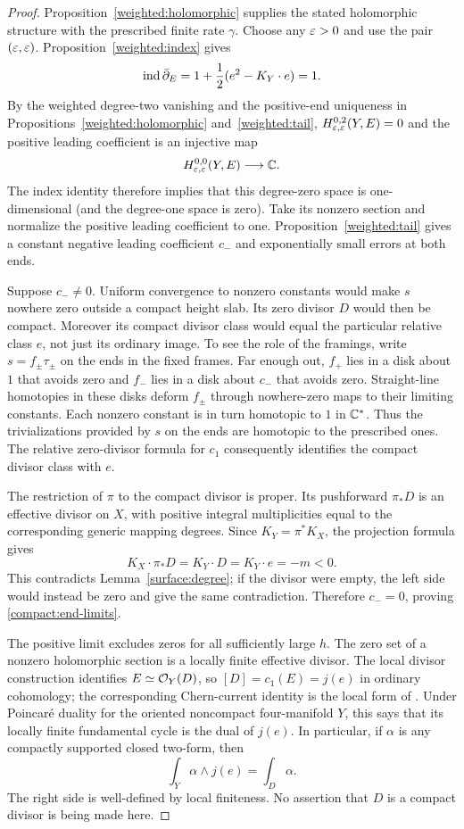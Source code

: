 \begin{proof}
Proposition~\ref{weighted:holomorphic} supplies the stated holomorphic
structure with the prescribed finite rate $\gamma$. Choose any
$\varepsilon>0$ and use the pair $(\varepsilon,\varepsilon)$.
Proposition~\ref{weighted:index} gives
\[
 \operatorname{ind}\bar\partial_E
 =1+\frac12(e^2-K_Y\cdot e)=1.
\]
By the weighted degree-two vanishing and the positive-end uniqueness
in Propositions~\ref{weighted:holomorphic} and~\ref{weighted:tail},
$H^{0,2}_{\varepsilon,\varepsilon}(Y,E)=0$ and
the positive leading coefficient is an injective map
\[
 H^{0,0}_{\varepsilon,\varepsilon}(Y,E)\longrightarrow\mathbb C.
\]
The index identity therefore implies that this degree-zero space is
one-dimensional (and the degree-one space is zero). Take its nonzero
section and normalize the positive leading coefficient to one.
Proposition~\ref{weighted:tail} gives a constant negative leading coefficient
$c_-$ and exponentially small errors at both ends.

Suppose $c_-\neq0$. Uniform convergence to nonzero constants would make
$s$ nowhere zero outside a compact height slab. Its zero divisor $D$
would then be compact. Moreover its compact divisor class would equal
the particular relative class $e$, not just its ordinary image. To see
the role of the framings, write $s=f_\pm\tau_\pm$ on the ends in the
fixed frames. Far enough out, $f_+$ lies in a disk about $1$ that avoids
zero and $f_-$ lies in a disk about $c_-$ that avoids zero. Straight-line
homotopies in these disks deform $f_\pm$ through nowhere-zero maps to
their limiting constants. Each nonzero constant is in turn homotopic
to $1$ in $\mathbb C^*$. Thus the trivializations provided by $s$ on the
ends are homotopic to the prescribed ones. The relative zero-divisor
formula for $c_1$ consequently identifies the compact divisor class
with $e$.

The restriction of $\pi$ to the compact divisor is proper. Its pushforward
$\pi_*D$ is an effective divisor on $X$, with positive integral
multiplicities equal to the corresponding generic mapping degrees.
Since $K_Y=\pi^*K_X$, the projection formula gives
\[
 K_X\cdot\pi_*D=K_Y\cdot D=K_Y\cdot e=-m<0.
\]
This contradicts Lemma~\ref{surface:degree}; if the divisor were empty,
the left side would instead be zero and give the same contradiction.
Therefore $c_-=0$, proving \eqref{compact:end-limits}.

The positive limit excludes zeros for all sufficiently large $h$.
The zero set of a nonzero holomorphic section is a locally finite
effective divisor. The local divisor construction identifies
$E\simeq\mathcal O_Y(D)$, so $[D]=c_1(E)=j(e)$ in ordinary cohomology;
the corresponding Chern-current identity is the local form of
\cite[Chapter~V, (13.2)]{Demailly2012}.
Under Poincar\'e duality for the oriented noncompact four-manifold $Y$,
this says that its locally finite fundamental cycle is the dual of
$j(e)$. In particular, if $\alpha$ is any compactly supported closed
two-form, then
\begin{equation}\label{compact:divisor-pairing}
 \int_Y\alpha\wedge j(e)=\int_D\alpha.
\end{equation}
The right side is well-defined by local finiteness. No assertion that
$D$ is a compact divisor is being made here.
\end{proof}

